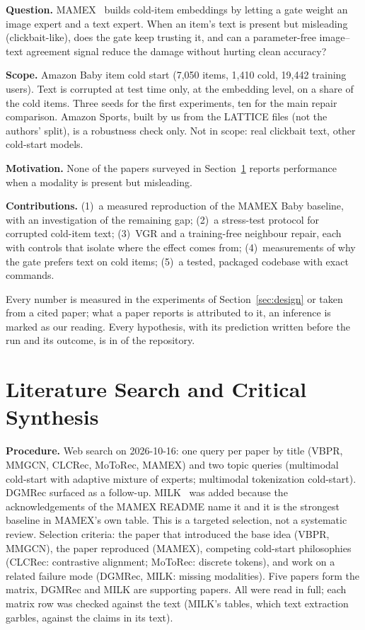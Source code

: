 \documentclass[conference]{IEEEtran}
\newcommand{\code}[1]{\texttt{\detokenize{#1}}}
\begin{document}
\textbf{Question.} MAMEX~\cite{nguyen2025mamex} builds cold-item embeddings by letting a gate weight an image expert and a text expert. When an item's text is present but misleading (clickbait-like), does the gate keep trusting it, and can a parameter-free image--text agreement signal reduce the damage without hurting clean accuracy?

\textbf{Scope.} Amazon Baby item cold start (7,050 items, 1,410 cold, 19,442 training users). Text is corrupted at test time only, at the embedding level, on a share of the cold items. Three seeds for the first experiments, ten for the main repair comparison. Amazon Sports, built by us from the LATTICE files (not the authors' split), is a robustness check only. Not in scope: real clickbait text, other cold-start models.

\textbf{Motivation.} None of the papers surveyed in Section~\ref{sec:lit} reports performance when a modality is present but misleading.

\textbf{Contributions.} (1)~a measured reproduction of the MAMEX Baby baseline, with an investigation of the remaining gap; (2)~a stress-test protocol for corrupted cold-item text; (3)~VGR and a training-free neighbour repair, each with controls that isolate where the effect comes from; (4)~measurements of why the gate prefers text on cold items; (5)~a tested, packaged codebase with exact commands.

Every number is measured in the experiments of Section~\ref{sec:design} or taken from a cited paper; what a paper reports is attributed to it, an inference is marked as our reading. Every hypothesis, with its prediction written before the run and its outcome, is in \code{docs/hypotheses.md} of the repository.

\section{Literature Search and Critical Synthesis}
\label{sec:lit}

\textbf{Procedure.} Web search on 2026-10-16: one query per paper by title (VBPR, MMGCN, CLCRec, MoToRec, MAMEX) and two topic queries (multimodal cold-start with adaptive mixture of experts; multimodal tokenization cold-start). DGMRec surfaced as a follow-up. MILK~\cite{bai2024milk} was added because the acknowledgements of the MAMEX README name it and it is the strongest baseline in MAMEX's own table. This is a targeted selection, not a systematic review. Selection criteria: the paper that introduced the base idea (VBPR, MMGCN), the paper reproduced (MAMEX), competing cold-start philosophies (CLCRec: contrastive alignment; MoToRec: discrete tokens), and work on a related failure mode (DGMRec, MILK: missing modalities). Five papers form the matrix, DGMRec and MILK are supporting papers. All were read in full; each matrix row was checked against the text (MILK's tables, which text extraction garbles, against the claims in its text).
\end{document}
